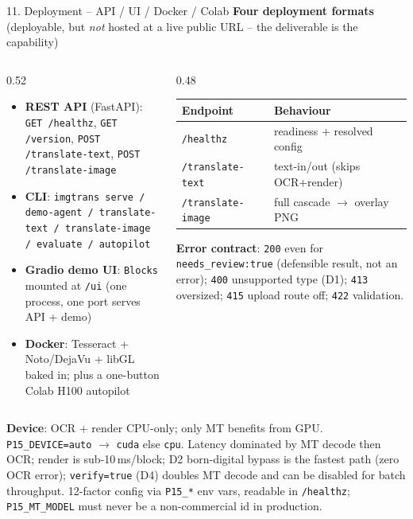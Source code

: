 \documentclass[10pt,aspectratio=169]{beamer}
\begin{document}
\begin{frame}[fragile]{11. Deployment -- API / UI / Docker / Colab}
\textbf{Four deployment formats} {\scriptsize(deployable, but \emph{not} hosted at a live public URL -- the deliverable is the capability)}
\begin{columns}[T]
\begin{column}{0.52\textwidth}
\begin{itemize}\scriptsize
  \item \textbf{REST API} (FastAPI): \texttt{GET /healthz}, \texttt{GET /version}, \texttt{POST /translate-text}, \texttt{POST /translate-image}
  \item \textbf{CLI}: \texttt{imgtrans serve / demo-agent / translate-text / translate-image / evaluate / autopilot}
  \item \textbf{Gradio demo UI}: \texttt{Blocks} mounted at \texttt{/ui} (one process, one port serves API + demo)
  \item \textbf{Docker}: Tesseract + Noto/DejaVu + libGL baked in; plus a one-button Colab H100 autopilot
\end{itemize}
\end{column}
\begin{column}{0.48\textwidth}
\begin{table}[h]
\centering\scriptsize
\begin{tabular}{ll}
\toprule
\textbf{Endpoint} & \textbf{Behaviour} \\
\midrule
\texttt{/healthz} & readiness + resolved config \\
\texttt{/translate-text} & text-in/out (skips OCR+render) \\
\texttt{/translate-image} & full cascade $\rightarrow$ overlay PNG \\
\bottomrule
\end{tabular}
\end{table}
\scriptsize \textbf{Error contract}: \texttt{200} even for \texttt{needs\_review:true} (defensible result, not an error); \texttt{400} unsupported type (D1); \texttt{413} oversized; \texttt{415} upload route off; \texttt{422} validation.
\end{column}
\end{columns}

\vspace{0.1cm}
\scriptsize \textbf{Device}: OCR + render CPU-only; only MT benefits from GPU. \texttt{P15\_DEVICE=auto} $\rightarrow$ \texttt{cuda} else \texttt{cpu}. Latency dominated by MT decode then OCR; render is sub-10\,ms/block; D2 born-digital bypass is the fastest path (zero OCR error); \texttt{verify=true} (D4) doubles MT decode and can be disabled for batch throughput. 12-factor config via \texttt{P15\_*} env vars, readable in \texttt{/healthz}; \texttt{P15\_MT\_MODEL} must never be a non-commercial id in production.
\end{frame}
\end{document}
